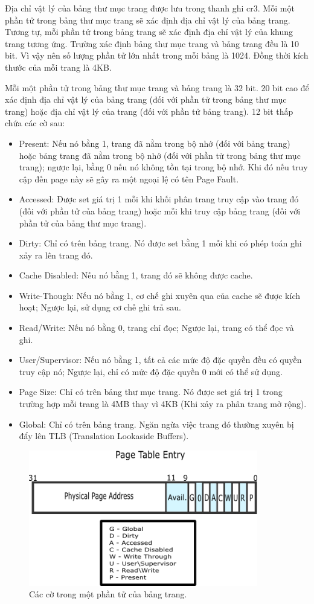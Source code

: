 \documentclass[12pt]{report}
\begin{document}
Địa chỉ vật lý của bảng thư mục trang được lưu trong thanh ghi cr3. Mỗi một phần tử trong bảng thư mục trang sẽ xác định địa chỉ vật lý của bảng trang. Tương tự, mỗi phần tử trong bảng trang sẽ xác định địa chỉ vật lý của khung trang tương ứng. Trường xác định bảng thư mục trang và bảng trang đều là 10 bit. Vì vậy nên số lượng phần tử lớn nhất trong mỗi bảng là 1024. Đồng thời kích thước của mỗi trang là 4KB.

Mỗi một phần tử trong bảng thư mục trang và bảng trang là 32 bit. 20 bit cao để xác định địa chỉ vật lý của bảng trang (đối với phần tử trong bảng thư mục trang) hoặc địa chỉ vật lý của trang (đối với phần tử bảng trang). 12 bit thấp chứa các cờ sau: \cite{paging}
\begin{itemize}
\item Present: Nếu nó bằng 1, trang đã nằm trong bộ nhớ (đối với bảng trang) hoặc bảng trang đã nằm trong bộ nhớ (đối với phần tử trong bảng thư mục trang); ngược lại, bằng 0 nếu nó không tồn tại trong bộ nhớ. Khi đó nếu truy cập đến page này sẽ gây ra một ngoại lệ có tên Page Fault. 
\item Accessed: Được set giá trị 1 mỗi khi khối phân trang truy cập vào trang đó (đối với phần tử của bảng trang) hoặc mỗi khi truy cập bảng trang (đối với phần tử của bảng thư mục trang).
\item Dirty: Chỉ có trên bảng trang. Nó được set bằng 1 mỗi khi có phép toán ghi xảy ra lên trang đó. 
\item Cache Disabled: Nếu nó bằng 1, trang đó sẽ không được cache.
\item Write-Though: Nếu nó bằng 1, cơ chế ghi xuyên qua của cache sẽ được kích hoạt; Ngược lại, sử dụng cơ chế ghi trả sau.
\item Read/Write: Nếu nó bằng 0, trang chỉ đọc; Ngược lại, trang có thể đọc và ghi.
\item User/Supervisor: Nếu nó bằng 1, tất cả các mức độ đặc quyền đều có quyền truy cập nó; Ngược lại, chỉ có mức độ đặc quyền 0 mới có thể sử dụng. 
\item Page Size: Chỉ có trên bảng thư mục trang. Nó được set giá trị 1 trong trường hợp mỗi trang là 4MB thay vì 4KB (Khi xảy ra phân trang mở rộng).
\item Global: Chỉ có trên bảng trang. Ngăn ngừa việc trang đó thường xuyên bị đẩy lên TLB (Translation Lookaside Buffers).
\end{itemize}

\begin{figure}[h]
\centering
\caption{Các cờ trong một phần tử của bảng trang.}
\includegraphics[width=10cm]{pte_flags.png}
\end{figure}
\end{document}
